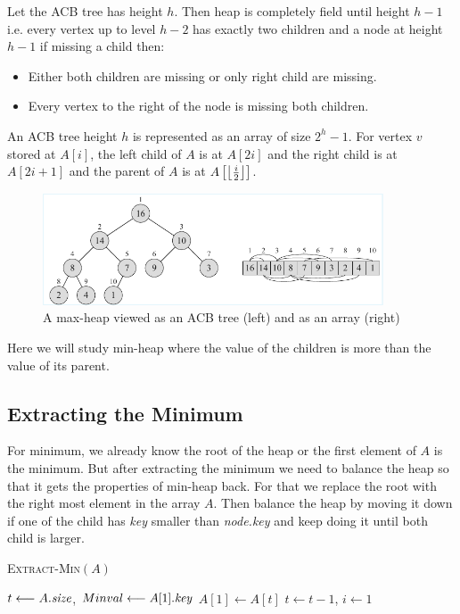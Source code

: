 Let the ACB tree has height $h$. Then heap  is completely field until height $h-1$ i.e. every vertex up to  level $h-2$ has exactly two children and a node at height $h-1$ if  missing a child then:\begin{itemize}
	\item Either both children are missing or only right child are missing.
	\item Every vertex to the right of the node is missing both children.
\end{itemize}An ACB tree height $h$ is represented as an array of size $2^h-1$. For vertex $v$ stored at $A[i]$, the left child of $A$ is at $A[2i]$ and the right child is at $A[2i+1]$ and the parent of $A$ is at $A\left[\left\lfloor\frac{i}{2}\right\rfloor\right]$.
\begin{figure}[h!]
	\centering
	\includegraphics[width=0.9\textwidth]{images/Heap.pdf}
	\caption{A max-heap viewed as an ACB tree (left) and as an array (right)}
\end{figure}

Here we will study min-heap where the value of the children is more than the value of its parent.
\subsection{Extracting the Minimum}
For minimum, we already know the root of the heap or the first element of $A$ is the minimum. But after extracting the minimum we need to balance the heap so that it gets the properties of min-heap back. For that we replace the root with the right most element in the array $A$. Then balance the heap by moving it down if one of the child has \emph{key} smaller than \emph{node.key} and keep doing it until both child is larger.
\begin{algorithm}[]
	\caption{\textsc{Extract-Min}$(A)$}
	\DontPrintSemicolon
	$t\longleftarrow A.\emph{size}$, $Minval\longleftarrow A[1].\emph{key}$\;
	$A[1]\longleftarrow A[t]$\;
	$t\longleftarrow t-1$, $i\longleftarrow 1$\;
\end{algorithm}

